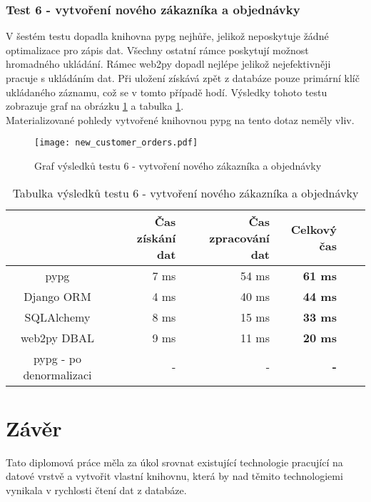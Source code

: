 \documentclass[ing,male,java,dept456]{diploma}						%
\begin{document}
\subsubsection{Test 6 - vytvoření nového zákazníka a objednávky}
V šestém testu dopadla knihovna pypg nejhůře, jelikož neposkytuje žádné optimalizace pro zápis dat. Všechny ostatní rámce poskytují možnost hromadného ukládání. Rámec web2py dopadl nejlépe jelikož nejefektivněji pracuje s ukládáním dat. Při uložení získává zpět z databáze pouze primární klíč ukládaného záznamu, což se v tomto případě hodí. Výsledky tohoto testu zobrazuje graf na obrázku \ref{fig:TestNCO} a tabulka \ref{tab:TestNCO}.\\
Materializované pohledy vytvořené knihovnou pypg na tento dotaz neměly vliv. \\

\begin{figure}[h!]
    \centering
    \texttt{[image: new\_customer\_orders.pdf]}
    \caption{Graf výsledků testu 6 - vytvoření nového zákazníka a objednávky}
    \label{fig:TestNCO}
\end{figure}
\begin{table}[h!]
  \centering
  \begin{tabular}{|c|r|r|r|r|r|}
    \hline
    & Čas získání dat & Čas zpracování dat & \textbf{Celkový čas} \\
    \hline
    pypg & 7 ms & 54 ms & \textbf{61 ms} \\
    \hline
    Django ORM & 4 ms & 40 ms & \textbf{44 ms} \\
    \hline
    SQLAlchemy & 8 ms & 15 ms & \textbf{33 ms} \\
    \hline
    web2py DBAL & 9 ms & 11 ms & \textbf{20 ms} \\
    \hline
    pypg - po denormalizaci & - & - & \textbf{-} \\
    \hline
  \end{tabular}
  \caption{Tabulka výsledků testu 6 - vytvoření nového zákazníka a objednávky}
  \label{tab:TestNCO}
\end{table}

\section{Závěr}
\label{sec:Conclusion}
Tato diplomová práce měla za úkol srovnat existující technologie pracující na datové vrstvě a vytvořit vlastní knihovnu, která by nad těmito technologiemi vynikala v rychlosti čtení dat z databáze. 
\end{document}
